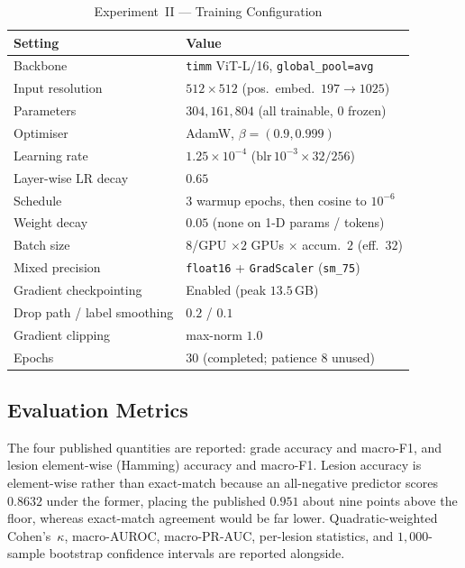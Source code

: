 \documentclass[journal,twoside,web]{ieeecolor}
\begin{document}
\begin{table}[!t]
\caption{Experiment~II --- Training Configuration}
\label{tab:exp2_hyper}
\centering
\setlength{\tabcolsep}{5pt}
\begin{tabular}{|l|l|}
\hline
\textbf{Setting} & \textbf{Value} \\
\hline
Backbone & \texttt{timm} ViT-L/16, \texttt{global\_pool=avg} \\
Input resolution & $512\times512$ (pos.\ embed.\ $197\!\rightarrow\!1025$) \\
Parameters & $304{,}161{,}804$ (all trainable, $0$ frozen) \\
Optimiser & AdamW, $\beta=(0.9,0.999)$ \\
Learning rate & $1.25\times10^{-4}$ ($\mathrm{blr}\,10^{-3}\!\times\!32/256$) \\
Layer-wise LR decay & $0.65$ \\
Schedule & $3$ warmup epochs, then cosine to $10^{-6}$ \\
Weight decay & $0.05$ (none on 1-D params / tokens) \\
Batch size & $8$/GPU $\times2$ GPUs $\times$ accum.\ $2$ (eff.\ $32$) \\
Mixed precision & \texttt{float16} + \texttt{GradScaler} (\texttt{sm\_75}) \\
Gradient checkpointing & Enabled (peak $13.5$\,GB) \\
Drop path / label smoothing & $0.2$ / $0.1$ \\
Gradient clipping & max-norm $1.0$ \\
Epochs & $30$ (completed; patience $8$ unused) \\
\hline
\end{tabular}
\end{table}

\subsection{Evaluation Metrics}
The four published quantities are reported: grade accuracy and macro-F1, and lesion
element-wise (Hamming) accuracy and macro-F1. Lesion accuracy is element-wise rather than
exact-match because an all-negative predictor scores $0.8632$ under the former, placing
the published $0.951$ about nine points above the floor, whereas exact-match agreement
would be far lower. Quadratic-weighted Cohen's~$\kappa$, macro-AUROC, macro-PR-AUC,
per-lesion statistics, and $1{,}000$-sample bootstrap confidence intervals are reported
alongside.
\end{document}
